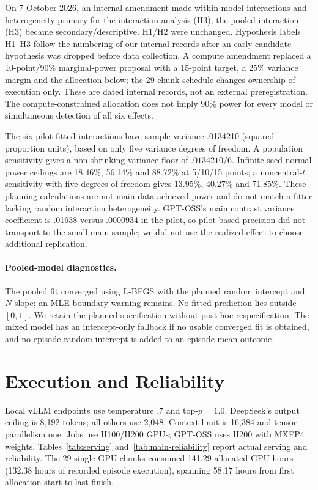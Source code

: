 \documentclass[11pt]{article}
\begin{document}
On 7 October 2026, an internal amendment made within-model interactions and heterogeneity primary for the interaction analysis (H3); the pooled interaction (H3) became secondary/descriptive. H1/H2 were unchanged. Hypothesis labels H1--H3 follow the numbering of our internal records after an early candidate hypothesis was dropped before data collection. A compute amendment replaced a 10-point/90\% marginal-power proposal with a 15-point target, a 25\% variance margin and the allocation below; the 29-chunk schedule changes ownership of execution only. These are dated internal records, not an external preregistration. The compute-constrained allocation does not imply 90\% power for every model or simultaneous detection of all six effects.


The six pilot fitted interactions have sample variance .0134210 (squared proportion units), based on only five variance degrees of freedom. A population sensitivity gives a non-shrinking variance floor of $.0134210/6$. Infinite-seed normal power ceilings are 18.46\%, 56.14\% and 88.72\% at 5/10/15 points; a noncentral-$t$ sensitivity with five degrees of freedom gives 13.95\%, 40.27\% and 71.85\%. These planning calculations are not main-data achieved power and do not match a fitter lacking random interaction heterogeneity. GPT-OSS's main contrast variance coefficient is .01638 versus .0000934 in the pilot, so pilot-based precision did not transport to the small main sample; we did not use the realized effect to choose additional replication.

\paragraph{Pooled-model diagnostics.} The pooled fit converged using L-BFGS with the planned random intercept and $N$ slope; an MLE boundary warning remains. No fitted prediction lies outside $[0,1]$. We retain the planned specification without post-hoc respecification. The mixed model has an intercept-only fallback if no usable converged fit is obtained, and no episode random intercept is added to an episode-mean outcome.

\section{Execution and Reliability}
\label{sec:execution}
Local vLLM endpoints use temperature .7 and top-$p=1.0$. DeepSeek's output ceiling is 8{,}192 tokens; all others use 2{,}048. Context limit is 16{,}384 and tensor parallelism one. Jobs use H100/H200 GPUs; GPT-OSS uses H200 with MXFP4 weights. Tables~\ref{tab:serving} and~\ref{tab:main-reliability} report actual serving and reliability. The 29 single-GPU chunks consumed 141.29 allocated GPU-hours (132.38 hours of recorded episode execution), spanning 58.17 hours from first allocation start to last finish.
\end{document}
